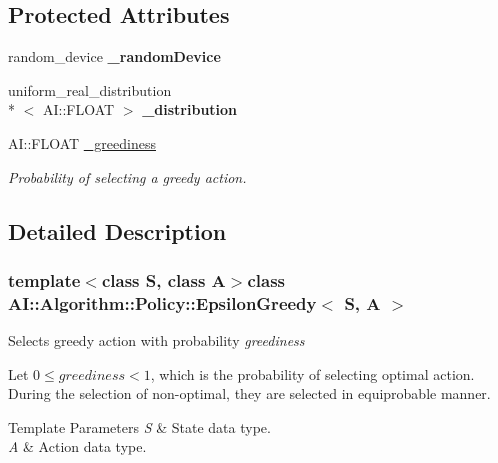 \subsection*{Protected Attributes}
\begin{DoxyCompactItemize}
\item 
\hypertarget{classAI_1_1Algorithm_1_1Policy_1_1EpsilonGreedy_a54f479df739292986b34a7c79c1d9dee}{random\-\_\-device {\bfseries \-\_\-random\-Device}}\label{classAI_1_1Algorithm_1_1Policy_1_1EpsilonGreedy_a54f479df739292986b34a7c79c1d9dee}

\item 
\hypertarget{classAI_1_1Algorithm_1_1Policy_1_1EpsilonGreedy_af9535e90c13a9a47074721d72a765339}{uniform\-\_\-real\-\_\-distribution\\*
$<$ A\-I\-::\-F\-L\-O\-A\-T $>$ {\bfseries \-\_\-distribution}}\label{classAI_1_1Algorithm_1_1Policy_1_1EpsilonGreedy_af9535e90c13a9a47074721d72a765339}

\item 
\hypertarget{classAI_1_1Algorithm_1_1Policy_1_1EpsilonGreedy_a2726a82fb23e6960c24402a756fef356}{A\-I\-::\-F\-L\-O\-A\-T \hyperlink{classAI_1_1Algorithm_1_1Policy_1_1EpsilonGreedy_a2726a82fb23e6960c24402a756fef356}{\-\_\-greediness}}\label{classAI_1_1Algorithm_1_1Policy_1_1EpsilonGreedy_a2726a82fb23e6960c24402a756fef356}

\begin{DoxyCompactList}\small\item\em Probability of selecting a greedy action. \end{DoxyCompactList}\end{DoxyCompactItemize}


\subsection{Detailed Description}
\subsubsection*{template$<$class S, class A$>$class A\-I\-::\-Algorithm\-::\-Policy\-::\-Epsilon\-Greedy$<$ S, A $>$}

Selects greedy action with probability {\itshape greediness} 

Let $ 0 \leq greediness < 1 $, which is the probability of selecting optimal action. During the selection of non-\/optimal, they are selected in equiprobable manner.


\begin{DoxyTemplParams}{Template Parameters}
{\em S} & State data type. \\
\hline
{\em A} & Action data type. \\
\hline
\end{DoxyTemplParams}


